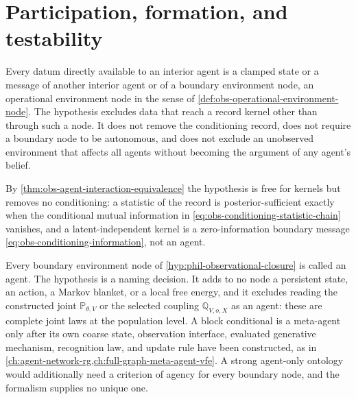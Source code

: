 \section{Participation, formation, and testability}
\label{sec:phil-participatory}
\label{sec:phil-testable}

Every datum directly available to an interior agent is a clamped state or a
message of another interior agent or of a boundary environment node, an
operational environment node in the sense of
\cref{def:obs-operational-environment-node}. The hypothesis excludes data that
reach a record kernel other than through such a node. It does not remove the
conditioning record, does not require a boundary node to be autonomous, and does
not exclude an unobserved environment that affects all agents without becoming
the argument of any agent's belief.

By \cref{thm:obs-agent-interaction-equivalence} the hypothesis is free for
kernels but removes no conditioning: a statistic of the record is
posterior-sufficient exactly when the conditional mutual information in
\eqref{eq:obs-conditioning-statistic-chain} vanishes, and a latent-independent
kernel is a zero-information boundary message
\eqref{eq:obs-conditioning-information}, not an agent.

Every boundary environment node of \cref{hyp:phil-observational-closure} is
called an agent. The hypothesis is a naming decision. It adds to no node a
persistent state, an action, a Markov blanket, or a local free energy, and it
excludes reading the constructed joint \(\mathbb P_{\theta,V}\) or the selected
coupling \(\mathbb Q_{V,o,X}\) as an agent: these are complete joint laws at the
population level. A block conditional is a meta-agent only after its own coarse
state, observation interface, evaluated generative mechanism, recognition law,
and update rule have been constructed, as in
\cref{ch:agent-network-rg,ch:full-graph-meta-agent-vfe}. A strong agent-only
ontology would additionally need a criterion of agency for every boundary node,
and the formalism supplies no unique one.

